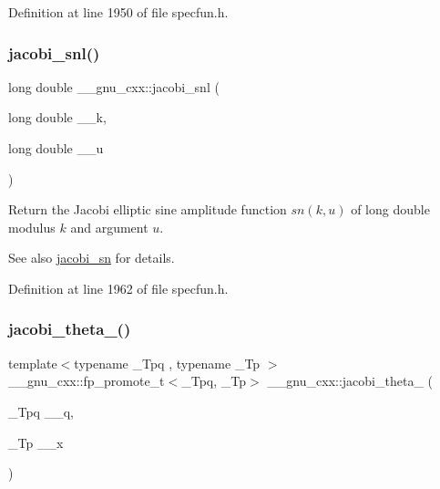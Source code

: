 Definition at line 1950 of file specfun.\+h.

\mbox{\label{group__gnu__math__spec__func_ga1c13539e3b051a07b1c28aa8a0aeb1b4}} 
\subsubsection{\texorpdfstring{jacobi\+\_\+snl()}{jacobi\_snl()}}
{\footnotesize\ttfamily long double \+\_\+\+\_\+gnu\+\_\+cxx\+::jacobi\+\_\+snl (\begin{DoxyParamCaption}\item[{long double}]{\+\_\+\+\_\+k,  }\item[{long double}]{\+\_\+\+\_\+u }\end{DoxyParamCaption})\hspace{0.3cm}{\ttfamily [inline]}}

Return the Jacobi elliptic sine amplitude function $ sn(k,u) $ of {\ttfamily long double} modulus $ k $ and argument $ u $.

\begin{DoxySeeAlso}{See also}
\hyperlink{group__gnu__math__spec__func_ga49d5e18152dd0dd0f496b8c8582e7045}{jacobi\+\_\+sn} for details. 
\end{DoxySeeAlso}


Definition at line 1962 of file specfun.\+h.

\mbox{\label{group__gnu__math__spec__func_ga996ca8c1fff75e2d4f196e99e0919933}} 
\subsubsection{\texorpdfstring{jacobi\+\_\+theta\+\_()}{jacobi\_theta\_1()}}
{\footnotesize\ttfamily template$<$typename \+\_\+\+Tpq , typename \+\_\+\+Tp $>$ \\
\+\_\+\+\_\+gnu\+\_\+cxx\+::fp\+\_\+promote\+\_\+t$<$\+\_\+\+Tpq, \+\_\+\+Tp$>$ \+\_\+\+\_\+gnu\+\_\+cxx\+::jacobi\+\_\+theta\+\_ (\begin{DoxyParamCaption}\item[{\+\_\+\+Tpq}]{\+\_\+\+\_\+q,  }\item[{\+\_\+\+Tp}]{\+\_\+\+\_\+x }\end{DoxyParamCaption})\hspace{0.3cm}{\ttfamily [inline]}}

